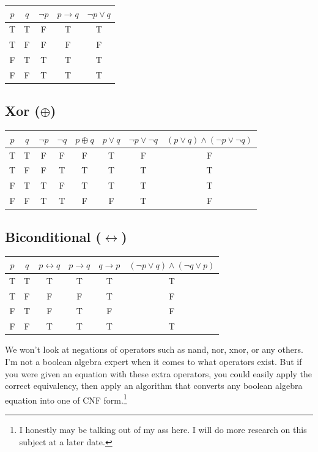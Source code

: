 \documentclass[oneside]{book}
\begin{document}
\begin{center}
\begin{tabular}{cc|c|c|c}
$p$ & $q$ & $\neg p$ & $p\rightarrow q$ & $\neg p\lor q$\\
\hline
T & T & F & T & T\\
T & F & F & F & F\\
F & T & T & T & T\\
F & F & T & T & T
\end{tabular}
\end{center}

\subsection*{Xor ($\oplus$)}

\begin{center}
\begin{tabular}{cc|cc|c|cc|c}
$p$ & $q$
& $\neg p$
& $\neg q$
& $p\oplus q$
& $p\lor q$
& $\neg p\lor\neg q$
& $(p\lor q)\land(\neg p\lor\neg q)$\\
\hline
T&T&F&F&F&T&F&F\\
T&F&F&T&T&T&T&T\\
F&T&T&F&T&T&T&T\\
F&F&T&T&F&F&T&F
\end{tabular}
\end{center}

\subsection*{Biconditional ($\leftrightarrow$)}

\begin{center}
\begin{tabular}{cc|c|cc|c}
$p$ & $q$
& $p\leftrightarrow q$
& $p\rightarrow q$
& $q\rightarrow p$
& $(\neg p\lor q)\land(\neg q\lor p)$\\
\hline
T&T&T&T&T&T\\
T&F&F&F&T&F\\
F&T&F&T&F&F\\
F&F&T&T&T&T
\end{tabular}
\end{center}

We won't look at negations of operators such as nand, nor, xnor, or any
others. I'm not a boolean algebra expert when it comes to what operators
exist. But if you were given an equation with these extra operators, you could
easily apply the correct equivalency, then apply an algorithm that converts any
boolean algebra equation into one of CNF form.\footnote{I honestly may be
talking out of my ass here. I will do more research on this subject at a later
date.}
\end{document}
